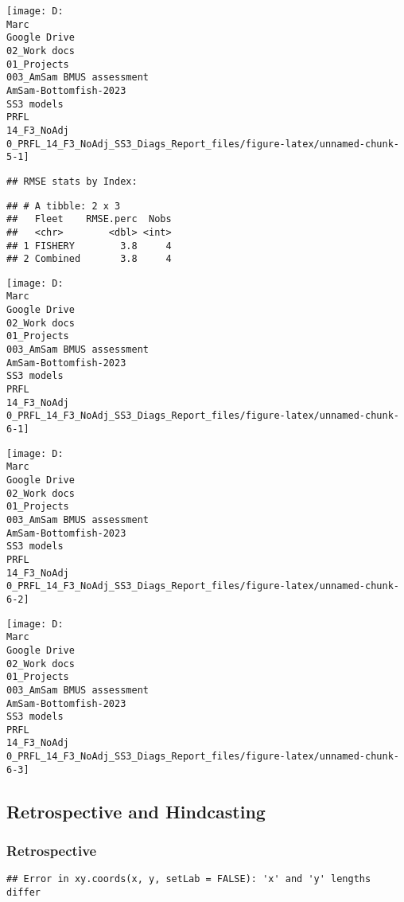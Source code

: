 \documentclass[
]{article}
\begin{document}
\begin{center}\texttt{[image: D:\\Marc\\Google Drive\\02\_Work docs\\01\_Projects\\003\_AmSam BMUS assessment\\AmSam-Bottomfish-2023\\SS3 models\\PRFL\\14\_F3\_NoAdj\\0\_PRFL\_14\_F3\_NoAdj\_SS3\_Diags\_Report\_files/figure-latex/unnamed-chunk-5-1]} \end{center}

\begin{verbatim}
## RMSE stats by Index:
\end{verbatim}

\begin{verbatim}
## # A tibble: 2 x 3
##   Fleet    RMSE.perc  Nobs
##   <chr>        <dbl> <int>
## 1 FISHERY        3.8     4
## 2 Combined       3.8     4
\end{verbatim}

\begin{center}\texttt{[image: D:\\Marc\\Google Drive\\02\_Work docs\\01\_Projects\\003\_AmSam BMUS assessment\\AmSam-Bottomfish-2023\\SS3 models\\PRFL\\14\_F3\_NoAdj\\0\_PRFL\_14\_F3\_NoAdj\_SS3\_Diags\_Report\_files/figure-latex/unnamed-chunk-6-1]} \end{center}

\begin{center}\texttt{[image: D:\\Marc\\Google Drive\\02\_Work docs\\01\_Projects\\003\_AmSam BMUS assessment\\AmSam-Bottomfish-2023\\SS3 models\\PRFL\\14\_F3\_NoAdj\\0\_PRFL\_14\_F3\_NoAdj\_SS3\_Diags\_Report\_files/figure-latex/unnamed-chunk-6-2]} \end{center}

\begin{center}\texttt{[image: D:\\Marc\\Google Drive\\02\_Work docs\\01\_Projects\\003\_AmSam BMUS assessment\\AmSam-Bottomfish-2023\\SS3 models\\PRFL\\14\_F3\_NoAdj\\0\_PRFL\_14\_F3\_NoAdj\_SS3\_Diags\_Report\_files/figure-latex/unnamed-chunk-6-3]} \end{center}

\hypertarget{retrospective-and-hindcasting}{%
\subsection{Retrospective and
Hindcasting}\label{retrospective-and-hindcasting}}

\hypertarget{retrospective}{%
\subsubsection{Retrospective}\label{retrospective}}

\begin{verbatim}
## Error in xy.coords(x, y, setLab = FALSE): 'x' and 'y' lengths differ
\end{verbatim}
\end{document}
